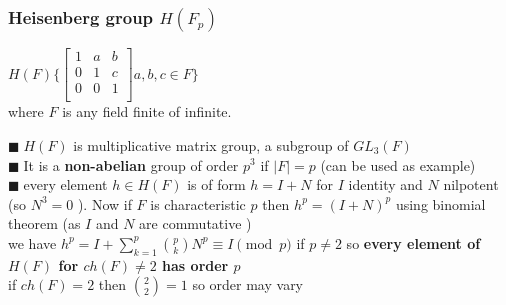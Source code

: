 \documentclass[11pt]{extarticle}
\newcommand{\snote}[1]{{\footnotesize(#1)}}
\newcommand{\y}{$\blacksquare\;$}
\newcommand{\tbx}[2][]{
	\begin{tcolorbox}[enhanced,breakable,size=small,colback=black!2!white,title={#1},arc is angular, arc=1.5mm,drop fuzzy shadow]
		#2
	\end{tcolorbox}
}
\begin{document}
\begin{multicols}{2}
	\subsubsection{Heisenberg group $ H(F_p) $ }
	\tbx{
	$ H(F)\{
	\begin{bmatrix}
		1 & a & b\\
		0 & 1 & c \\
		0 & 0 & 1 \\
	\end{bmatrix}  a,b,c \in F \}$ \\
where $ F $ is any field finite of infinite.}
\tbx[Properties ]{
\y $ H(F) $ is multiplicative matrix group, a subgroup of $ GL_3(F) $ \\
\y It is a \textbf{non-abelian } group of order $ p^3 $ if $ |F|=p $ \snote{can be used as example}\\
\y every element  $ h\in H(F) $ is of  form $ h=I+N $ for $ I $ identity and $ N $ nilpotent \snote{so $ N^3=0 $ }.
Now if $ F $ is characteristic $ p $ then $ h^p=(I+N)^p $ using binomial theorem \snote{as $ I $ and $ N $ are commutative } \\
we  have $ h^p=I+\sum\limits_{k=1}^{p} {p \choose k } N^p \equiv I \pmod{p}$ if $ p\neq 2 $  so 
\textbf{every element of $ H(F) $ for $ ch(F)\neq 2 $ has order $ p $ }\\
if $ ch(F)=2 $ then $ {2 \choose 2}=1 $ so order may vary }


\end{multicols}
\end{document}
